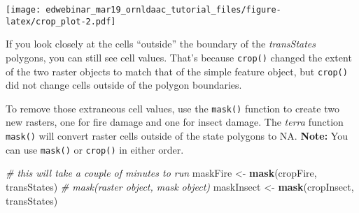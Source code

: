 \documentclass[
]{article}
\newenvironment{Shaded}{\begin{snugshade}}{\end{snugshade}}
\newcommand{\AttributeTok}[1]{\textcolor[rgb]{0.13,0.29,0.53}{#1}}
\newcommand{\CommentTok}[1]{\textcolor[rgb]{0.56,0.35,0.01}{\textit{#1}}}
\newcommand{\ConstantTok}[1]{\textcolor[rgb]{0.56,0.35,0.01}{#1}}
\newcommand{\DecValTok}[1]{\textcolor[rgb]{0.00,0.00,0.81}{#1}}
\newcommand{\FloatTok}[1]{\textcolor[rgb]{0.00,0.00,0.81}{#1}}
\newcommand{\FunctionTok}[1]{\textcolor[rgb]{0.13,0.29,0.53}{\textbf{#1}}}
\newcommand{\NormalTok}[1]{#1}
\newcommand{\OtherTok}[1]{\textcolor[rgb]{0.56,0.35,0.01}{#1}}
\newcommand{\SpecialCharTok}[1]{\textcolor[rgb]{0.81,0.36,0.00}{\textbf{#1}}}
\newcommand{\StringTok}[1]{\textcolor[rgb]{0.31,0.60,0.02}{#1}}
\begin{document}
\begin{Shaded}
\end{Shaded}

\texttt{[image: edwebinar\_mar19\_ornldaac\_tutorial\_files/figure-latex/crop\_plot-2.pdf]}

If you look closely at the cells ``outside'' the boundary of the
\emph{transStates} polygons, you can still see cell values. That's
because \texttt{crop()} changed the extent of the two raster objects to
match that of the simple feature object, but \texttt{crop()} did not
change cells outside of the polygon boundaries.

To remove those extraneous cell values, use the \texttt{mask()} function
to create two new rasters, one for fire damage and one for insect
damage. The \emph{terra} function \texttt{mask()} will convert raster
cells outside of the state polygons to NA. \textbf{Note:} You can use
\texttt{mask()} or \texttt{crop()} in either order.

\begin{Shaded}
\begin{Highlighting}[]
\CommentTok{\# this will take a couple of minutes to run}
\NormalTok{maskFire }\OtherTok{\textless{}{-}} \FunctionTok{mask}\NormalTok{(cropFire, transStates)  }\CommentTok{\# mask(raster object, mask object)}
\NormalTok{maskInsect }\OtherTok{\textless{}{-}} \FunctionTok{mask}\NormalTok{(cropInsect, transStates)}
\end{Highlighting}
\end{Shaded}
\end{document}
